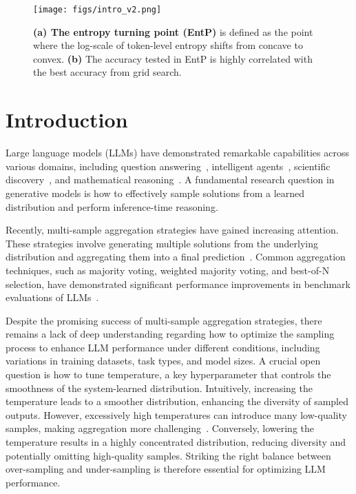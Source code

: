 \begin{figure}[ht]
    \centering
    \texttt{[image: figs/intro\_v2.png]}
    \vspace{-7mm}
    \caption{\textbf{(a) The entropy turning point (EntP)} is defined as the point where the log-scale of token-level entropy shifts from concave to convex. \textbf{(b)} The accuracy tested in EntP is highly correlated with the best accuracy from grid search.}
    \label{fig: temp_in_intro}
    \vspace{-3.5mm}
\end{figure}
\section{Introduction}
Large language models (LLMs) have demonstrated remarkable capabilities across various domains, including question answering~\cite{kamalloo2023evaluating}, intelligent agents~\cite{wang2024survey, zhang2023building}, scientific discovery~\cite{ma2024llm, romera2024mathematical}, and mathematical reasoning~\cite{ahn2024large, sun2024easy, lin2024lean, wu2024inference}. A fundamental research question in generative models is how to effectively sample solutions from a learned distribution and perform inference-time reasoning.

Recently, multi-sample aggregation strategies have gained increasing attention. These strategies involve generating multiple solutions from the underlying distribution and aggregating them into a final prediction~\cite{wei2022chain, yao2024tree}. Common aggregation techniques, such as majority voting, weighted majority voting, and best-of-N selection, have demonstrated significant performance improvements in benchmark evaluations of LLMs~\cite{welleck2024decoding, wang2024planning}.

Despite the promising success of multi-sample aggregation strategies, there remains a lack of deep understanding regarding how to optimize the sampling process to enhance LLM performance under different conditions, including variations in training datasets, task types, and model sizes. A crucial open question is how to tune temperature, a key hyperparameter that controls the smoothness of the system-learned distribution. Intuitively, increasing the temperature leads to a smoother distribution, enhancing the diversity of sampled outputs. However, excessively high temperatures can introduce many low-quality samples, making aggregation more challenging~\cite{holtzman2019curious, renze2024effect}. Conversely, lowering the temperature results in a highly concentrated distribution, reducing diversity and potentially omitting high-quality samples. Striking the right balance between over-sampling and under-sampling is therefore essential for optimizing LLM performance.

